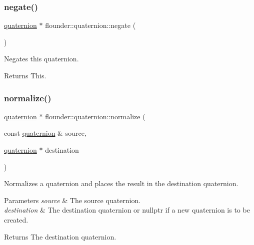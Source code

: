 \subsubsection{\texorpdfstring{negate()}{negate()}\hspace{0.1cm}{\footnotesize\ttfamily [2/2]}}
{\footnotesize\ttfamily \hyperlink{classflounder_1_1quaternion}{quaternion} $\ast$ flounder\+::quaternion\+::negate (\begin{DoxyParamCaption}{ }\end{DoxyParamCaption})}



Negates this quaternion. 

\begin{DoxyReturn}{Returns}
This. 
\end{DoxyReturn}
\mbox{\label{classflounder_1_1quaternion_ae5092edec94adfdd43add8f3825072fe}} 
\subsubsection{\texorpdfstring{normalize()}{normalize()}\hspace{0.1cm}{\footnotesize\ttfamily [1/2]}}
{\footnotesize\ttfamily \hyperlink{classflounder_1_1quaternion}{quaternion} $\ast$ flounder\+::quaternion\+::normalize (\begin{DoxyParamCaption}\item[{const \hyperlink{classflounder_1_1quaternion}{quaternion} \&}]{source,  }\item[{\hyperlink{classflounder_1_1quaternion}{quaternion} $\ast$}]{destination }\end{DoxyParamCaption})\hspace{0.3cm}{\ttfamily [static]}}



Normalizes a quaternion and places the result in the destination quaternion. 


\begin{DoxyParams}{Parameters}
{\em source} & The source quaternion. \\
\hline
{\em destination} & The destination quaternion or nullptr if a new quaternion is to be created.\\
\hline
\end{DoxyParams}
\begin{DoxyReturn}{Returns}
The destination quaternion. 
\end{DoxyReturn}
\mbox{\label{classflounder_1_1quaternion_a01318feb0c32b259ee5325db9f78fe7e}} 
